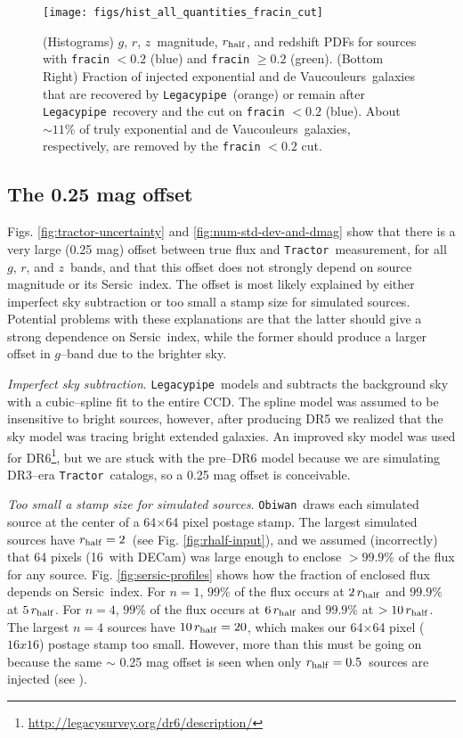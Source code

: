 \documentclass[a4paper,fleqn,usenatbib]{mnras}
\newcommand{\rhalf}{r_{\rm{half}}}
\newcommand{\gb}{$g$}
\newcommand{\rband}{$r$}
\newcommand{\zb}{$z$}
\newcommand{\tractor}{{\tt Tractor}}
\newcommand{\legacypipe}{{\tt Legacypipe}}
\newcommand{\obiwan}{{\tt Obiwan}}
\newcommand{\sersic}{Sersic}
\newcommand{\dev}{de Vaucouleurs}
\begin{document}
\begin{figure}
\begin{center}
 \texttt{[image: figs/hist\_all\_quantities\_fracin\_cut]}
\end{center}
 \caption{(Histograms) \gb, \rband, \zb\, magnitude, $\rhalf$, and redshift PDFs for sources with {\tt{fracin}} $< 0.2$ (blue) and {\tt{fracin}} $\ge 0.2$ (green). (Bottom Right) Fraction of injected exponential and \dev\, galaxies that are recovered by \legacypipe\, (orange) or remain after \legacypipe\, recovery and the cut on {\tt{fracin}} $< 0.2$ (blue). About $\sim 11$\% of truly exponential and \dev\, galaxies, respectively, are removed by the {\tt{fracin}} $< 0.2$ cut.}
 \label{fig:safe-to-remove}
\end{figure}

\subsection{The 0.25 mag offset}
\label{sec:the-offset}

Figs. \ref{fig:tractor-uncertainty} and \ref{fig:num-std-dev-and-dmag} show that there is a very large (0.25 mag) offset between true flux and \tractor\, measurement, for all \gb, \rband, and \zb\, bands, and that this offset does not strongly depend on source magnitude or its \sersic\, index. The offset is most likely explained by either imperfect sky subtraction or too small a stamp size for simulated sources. Potential problems with these explanations are that the latter should give a strong dependence on \sersic\, index, while the former should produce a larger offset in \gb--band due to the brighter sky. 

{\it{Imperfect sky subtraction}}. \legacypipe\, models and subtracts the background sky with a cubic--spline fit to the entire CCD. The spline model was assumed to be insensitive to bright sources, however, after producing DR5 we realized that the sky model was tracing bright extended galaxies. An improved sky model was used for DR6\footnote{\url{http://legacysurvey.org/dr6/description/}}, but we are stuck with the pre--DR6 model because we are simulating DR3--era \tractor\, catalogs, so a 0.25 mag offset is conceivable. 

{\it{Too small a stamp size for simulated sources}}. \obiwan\, draws each simulated source at the center of a 64$\times$64 pixel postage stamp. The largest simulated sources have $\rhalf = 2$\arcsec\, (see Fig. \ref{fig:rhalf-input}), and we assumed (incorrectly) that 64 pixels (16\arcsec\, with DECam) was large enough to enclose $> 99.9\%$ of the flux for any source. Fig. \ref{fig:sersic-profiles} shows how the fraction of enclosed flux depends on \sersic\, index. For $n = 1$, $99\%$ of the flux occurs at $2\, \rhalf$ and $99.9\%$ at $5\, \rhalf$. For $n = 4$, $99\%$ of the flux occurs at $6\, \rhalf$ and $99.9\%$ at $> 10\, \rhalf$. The largest $n=4$ sources have $10\, \rhalf = 20$\arcsec, which makes our 64$\times$64 pixel ($16x16$\arcsec) postage stamp too small. However, more than this must be going on because the same $\sim$ 0.25 mag offset is seen when only $\rhalf = 0.5$\arcsec\, sources are injected (see \citealt{obiwanMethods}).
\end{document}
